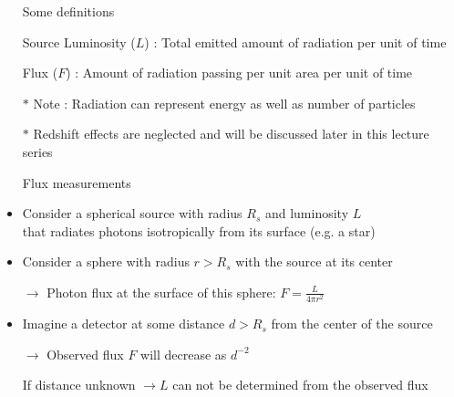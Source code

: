 \onecolumn
\begin{itemize}
\item[] \begin{center} {\red Some definitions} \end{center}
\item[] {\blue Source Luminosity ($L$) : Total emitted amount of radiation per unit of time}
\item[] {\blue Flux ($F$) : Amount of radiation passing per unit area per unit of time}
\item[$\ast$] Note : Radiation can represent energy as well as number of particles
\item[$\ast$] Redshift effects are neglected and will be discussed later in this lecture series
\item[] \begin{center} {\red Flux measurements} \end{center}
\item Consider a spherical source with radius $R_{s}$ and luminosity $L$\\
      that radiates photons isotropically from its surface (e.g. a star)
\item Consider a sphere with radius $r>R_{s}$ with the source at its center
\item[] $\rightarrow$ Photon flux at the surface of this sphere: $\displaystyle F=\frac{L}{4\pi r^{2}}$
\item Imagine a detector at some distance $d>R_{s}$ from the center of the source
\item[] $\rightarrow$ Observed flux $F$ will decrease as $d^{-2}$
\item[] {\blue If distance unknown $\rightarrow L$ can not be determined from the observed flux}
\end{itemize}

